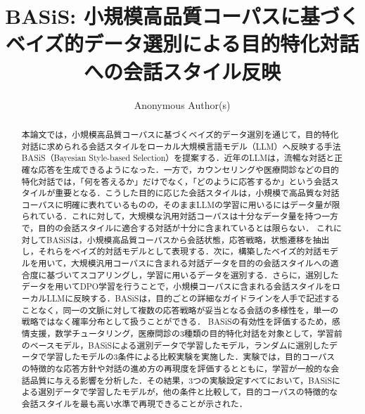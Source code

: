 \documentclass[manuscript,review,anonymous]{acmart}
\makeatletter
\newcommand{\ActivateCJKForPDFLaTeX}{%
  \CJKnospace
  \CJK@envStart{}{UTF8}{min}%
}
\makeatother
\begin{document}
\ActivateCJKForPDFLaTeX

\title{BASiS: 小規模高品質コーパスに基づくベイズ的データ選別による目的特化対話への会話スタイル反映}

\author{Anonymous Author(s)}
\renewcommand{\shortauthors}{Anonymous Author(s)}

\begin{abstract}
本論文では，小規模高品質コーパスに基づくベイズ的データ選別を通じて，目的特化対話に求められる会話スタイルをローカル大規模言語モデル（LLM）へ反映する手法BASiS（Bayesian Style-based Selection）を提案する．近年のLLMは，流暢な対話と正確な応答を生成できるようになった．一方で，カウンセリングや医療問診などの目的特化対話では，「何を答えるか」だけでなく，「どのように応答するか」という会話スタイルが重要となる．こうした目的に応じた会話スタイルは，小規模で高品質な対話コーパスに明確に表れているものの，そのままLLMの学習に用いるにはデータ量が限られている．これに対して，大規模な汎用対話コーパスは十分なデータ量を持つ一方で，目的の会話スタイルに適合する対話が十分に含まれているとは限らない．
これに対してBASiSは，小規模高品質コーパスから会話状態，応答戦略，状態遷移を抽出し，それらをベイズ的対話モデルとして表現する．次に，構築したベイズ的対話モデルを用いて，大規模汎用コーパスに含まれる対話データを目的の会話スタイルへの適合度に基づいてスコアリングし，学習に用いるデータを選別する．さらに，選別したデータを用いてDPO学習を行うことで，小規模コーパスに含まれる会話スタイルをローカルLLMに反映する．BASiSは，目的ごとの詳細なガイドラインを人手で記述することなく，同一の文脈に対して複数の応答戦略が妥当となる会話の多様性を，単一の戦略ではなく確率分布として扱うことができる．
BASiSの有効性を評価するため，感情支援，数学チュータリング，医療問診の3種類の目的特化対話を対象として，学習前のベースモデル，BASiSによる選別データで学習したモデル，ランダムに選別したデータで学習したモデルの3条件による比較実験を実施した．実験では，目的コーパスの特徴的な応答方針や対話の進め方の再現度を評価するとともに，学習が一般的な会話品質に与える影響を分析した．その結果，3つの実験設定すべてにおいて，BASiSによる選別データで学習したモデルが，他の条件と比較して，目的コーパスの特徴的な会話スタイルを最も高い水準で再現できることが示された．
\end{abstract}
\end{document}
